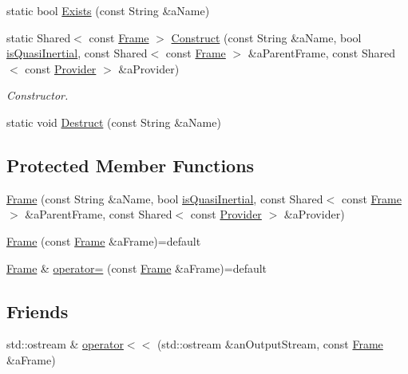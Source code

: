 \begin{DoxyCompactItemize}
\item 
static bool \hyperlink{classostk_1_1physics_1_1coord_1_1_frame_afe14b695035c704b408563a12a47eb38}{Exists} (const String \&a\+Name)
\item 
static Shared$<$ const \hyperlink{classostk_1_1physics_1_1coord_1_1_frame}{Frame} $>$ \hyperlink{classostk_1_1physics_1_1coord_1_1_frame_a6faa8908c55e5e56ce3ed4c96d15b9af}{Construct} (const String \&a\+Name, bool \hyperlink{classostk_1_1physics_1_1coord_1_1_frame_ac0f7d78be14f09ccef5b862c4f963da8}{is\+Quasi\+Inertial}, const Shared$<$ const \hyperlink{classostk_1_1physics_1_1coord_1_1_frame}{Frame} $>$ \&a\+Parent\+Frame, const Shared$<$ const \hyperlink{classostk_1_1physics_1_1coord_1_1frame_1_1_provider}{Provider} $>$ \&a\+Provider)
\begin{DoxyCompactList}\small\item\em Constructor. \end{DoxyCompactList}\item 
static void \hyperlink{classostk_1_1physics_1_1coord_1_1_frame_a2c4bf16207b59862deaeee224153b8f9}{Destruct} (const String \&a\+Name)
\end{DoxyCompactItemize}
\subsection*{Protected Member Functions}
\begin{DoxyCompactItemize}
\item 
\hyperlink{classostk_1_1physics_1_1coord_1_1_frame_a66f32d0c9dd2497b6e7ace4fcccbce60}{Frame} (const String \&a\+Name, bool \hyperlink{classostk_1_1physics_1_1coord_1_1_frame_ac0f7d78be14f09ccef5b862c4f963da8}{is\+Quasi\+Inertial}, const Shared$<$ const \hyperlink{classostk_1_1physics_1_1coord_1_1_frame}{Frame} $>$ \&a\+Parent\+Frame, const Shared$<$ const \hyperlink{classostk_1_1physics_1_1coord_1_1frame_1_1_provider}{Provider} $>$ \&a\+Provider)
\item 
\hyperlink{classostk_1_1physics_1_1coord_1_1_frame_acaa7ddfcad1566838ca72bf431a3bd4f}{Frame} (const \hyperlink{classostk_1_1physics_1_1coord_1_1_frame}{Frame} \&a\+Frame)=default
\item 
\hyperlink{classostk_1_1physics_1_1coord_1_1_frame}{Frame} \& \hyperlink{classostk_1_1physics_1_1coord_1_1_frame_ac47e4fe942c8cd0b8969ee9f6d32b816}{operator=} (const \hyperlink{classostk_1_1physics_1_1coord_1_1_frame}{Frame} \&a\+Frame)=default
\end{DoxyCompactItemize}
\subsection*{Friends}
\begin{DoxyCompactItemize}
\item 
std\+::ostream \& \hyperlink{classostk_1_1physics_1_1coord_1_1_frame_a509ac1926cfc3553748bace204e2b1cc}{operator$<$$<$} (std\+::ostream \&an\+Output\+Stream, const \hyperlink{classostk_1_1physics_1_1coord_1_1_frame}{Frame} \&a\+Frame)
\end{DoxyCompactItemize}


